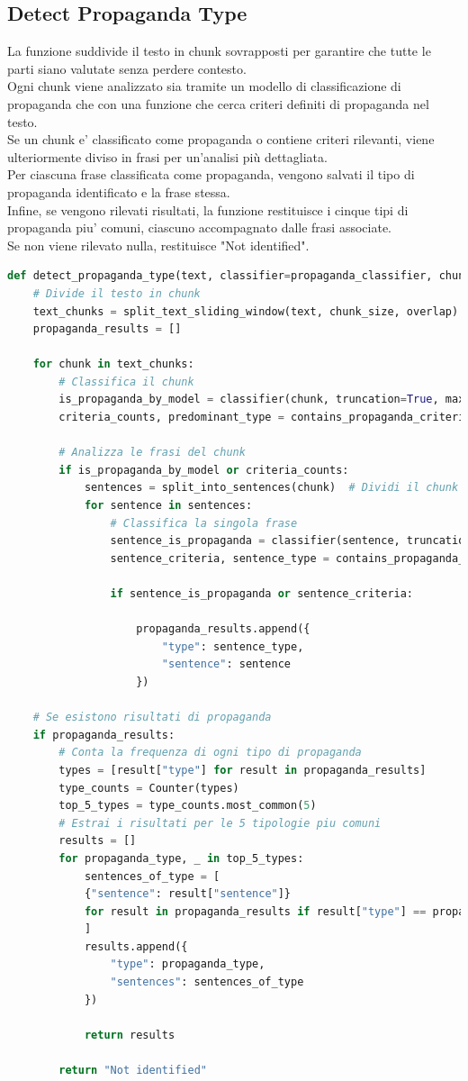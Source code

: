 \documentclass{article}
\begin{document}
		\subsection{Detect Propaganda Type}
La funzione suddivide il testo in chunk sovrapposti per garantire che tutte le parti siano valutate senza perdere contesto. \\ Ogni chunk viene analizzato sia tramite un modello di classificazione di propaganda che con una funzione che cerca criteri definiti di propaganda nel testo. \\ Se un chunk e' classificato come propaganda o contiene criteri rilevanti, viene ulteriormente diviso in frasi per un'analisi più dettagliata.\\
Per ciascuna frase classificata come propaganda, vengono salvati il tipo di propaganda identificato e la frase stessa. \\Infine, se vengono rilevati risultati, la funzione restituisce i cinque tipi di propaganda piu' comuni, ciascuno accompagnato dalle frasi associate. \\Se non viene rilevato nulla, restituisce "Not identified".	
	\begin{lstlisting}[language=python]
def detect_propaganda_type(text, classifier=propaganda_classifier, chunk_size=512, overlap=128):
	# Divide il testo in chunk
	text_chunks = split_text_sliding_window(text, chunk_size, overlap)
	propaganda_results = []

	for chunk in text_chunks:
		# Classifica il chunk
		is_propaganda_by_model = classifier(chunk, truncation=True, max_length=chunk_size)[0]['label'] == "propaganda"
		criteria_counts, predominant_type = contains_propaganda_criteria(chunk)

		# Analizza le frasi del chunk
		if is_propaganda_by_model or criteria_counts:
			sentences = split_into_sentences(chunk)  # Dividi il chunk in frasi
			for sentence in sentences:
				# Classifica la singola frase
				sentence_is_propaganda = classifier(sentence, truncation=True)[0]['label'] == "propaganda"
				sentence_criteria, sentence_type = contains_propaganda_criteria(sentence)
				
				if sentence_is_propaganda or sentence_criteria:

					propaganda_results.append({
						"type": sentence_type,
						"sentence": sentence
					})

	# Se esistono risultati di propaganda
	if propaganda_results:
		# Conta la frequenza di ogni tipo di propaganda
		types = [result["type"] for result in propaganda_results]
		type_counts = Counter(types)
		top_5_types = type_counts.most_common(5)
		# Estrai i risultati per le 5 tipologie piu comuni
		results = []
		for propaganda_type, _ in top_5_types:
			sentences_of_type = [
			{"sentence": result["sentence"]}
			for result in propaganda_results if result["type"] == propaganda_type
			]
			results.append({
				"type": propaganda_type,
				"sentences": sentences_of_type
			})
			
			return results
			
		return "Not identified"

	\end{lstlisting}
	
\end{document}
